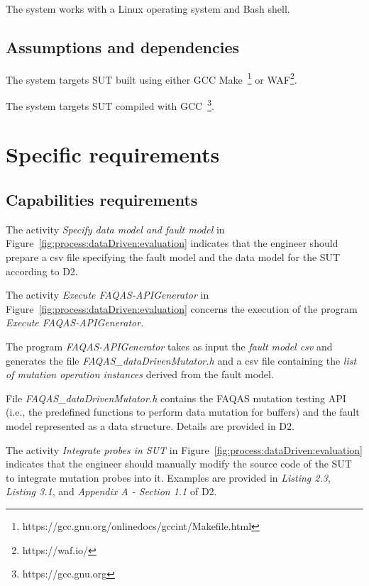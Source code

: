\RQ{} The system works with a Linux operating system and Bash shell.

\subsection{Assumptions and dependencies}

\RQ{} The system targets SUT built using either GCC Make~\footnote{https://gcc.gnu.org/onlinedocs/gccint/Makefile.html} or WAF\footnote{https://waf.io/}.

\RQ{} The system targets SUT compiled with GCC~\footnote{https://gcc.gnu.org}.

\section{Specific requirements}
\subsection{Capabilities requirements}
\label{sec:data:rquirements:capabilities}

\RQ The activity \emph{Specify data model and fault model} in Figure~\ref{fig:process:dataDriven:evaluation} indicates that the engineer should prepare a csv file specifying the fault model and the data model for the SUT according to D2.

\RQ{} The activity \emph{Execute FAQAS-APIGenerator} in Figure~\ref{fig:process:dataDriven:evaluation} concerns the execution of the program \emph{Execute FAQAS-APIGenerator}.

\RQ{} The program \emph{FAQAS-APIGenerator} takes as input the \emph{fault model csv} and generates the file \emph{FAQAS\_dataDrivenMutator.h} and a csv file containing the \emph{list of mutation operation instances} derived from the fault model.

\RQ{} File \emph{FAQAS\_dataDrivenMutator.h} contains the FAQAS mutation testing API (i.e., the predefined functions to perform data mutation for buffers) and the fault model represented as a data structure. Details are provided in D2.

\RQ{} The activity \emph{Integrate probes in SUT} in Figure~\ref{fig:process:dataDriven:evaluation} indicates that the engineer should manually modify the source code of the SUT to integrate mutation probes into it. Examples are provided in \emph{Listing 2.3}, \emph{Listing 3.1}, and \emph{Appendix A - Section 1.1} of D2. 

